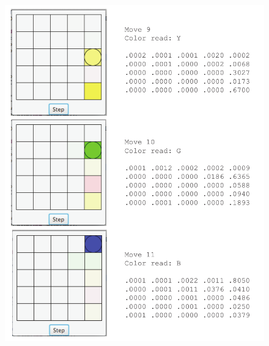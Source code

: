 \documentclass{article}
\begin{document}
\begin{figure}[H]
\centering
\includegraphics[scale=0.8]{example4.pdf}
\end{figure}

\newpage
\end{document}
